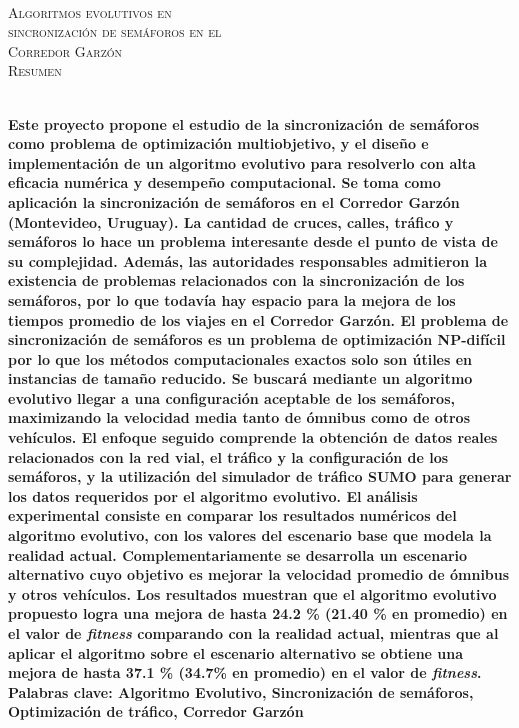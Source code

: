 {
\thispagestyle{empty}
~\\[0.2cm]
\begin{center}
    \textsc{\huge Algoritmos evolutivos en  } \\[0.2cm] 
    \textsc{\huge sincronización de semáforos en el  } \\[0.2cm]         
    \textsc{\huge Corredor Garzón} \\[1cm]
    \textsc{\Large Resumen}
\end{center}
~\\[0.2cm]
\textbf{\large 
Este proyecto propone el estudio de la sincronización de semáforos como problema de optimización multiobjetivo, y el diseño e implementación de un algoritmo evolutivo para resolverlo con alta eficacia numérica y desempeño computacional. Se toma como aplicación la sincronización de semáforos en el Corredor Garzón  (Montevideo, Uruguay). La cantidad de cruces, calles, tráfico y semáforos lo hace un problema interesante desde el punto de vista de su complejidad. Además, las autoridades responsables admitieron la existencia de problemas relacionados con la sincronización de los semáforos, por lo que todavía hay espacio para la mejora de los tiempos promedio de los viajes en el Corredor Garzón.  \newline \newline
El problema de sincronización de semáforos es un problema de optimización NP-difícil por lo que los métodos computacionales exactos solo son útiles en instancias de tamaño reducido. Se buscará mediante un algoritmo evolutivo llegar a una configuración aceptable de los semáforos, maximizando la velocidad media tanto de ómnibus como de otros vehículos.
El enfoque seguido comprende la obtención de datos reales relacionados con la red vial, el tráfico y la configuración de los semáforos, y la utilización del simulador de tráfico SUMO para generar los datos requeridos por el algoritmo evolutivo.
\newline \newline
El análisis experimental consiste en comparar los resultados numéricos del algoritmo evolutivo, con los valores del escenario base que modela la realidad actual. Complementariamente se desarrolla un escenario alternativo cuyo objetivo es mejorar la velocidad promedio de ómnibus y otros vehículos. Los resultados muestran que el algoritmo evolutivo propuesto logra una mejora de hasta 24.2 \% (21.40 \% en promedio) en el valor de \emph{fitness} comparando con la realidad actual, mientras que al aplicar el algoritmo sobre el escenario alternativo se obtiene una mejora de hasta 37.1 \% (34.7\% en promedio) en el valor de \emph{fitness}.
 } 	
	~\\[1.0cm]
    \textbf{\large Palabras clave: Algoritmo Evolutivo, Sincronización de semáforos, Optimización de tráfico, Corredor Garzón}

}
\cleardoublepage
